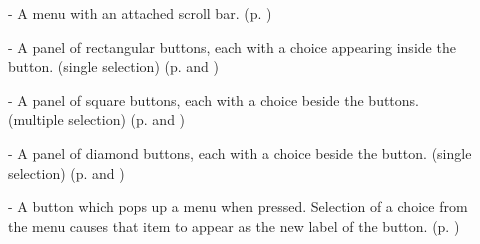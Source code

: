 \begin{itemize}
\begin{description}
\item[]  - A menu with an attached scroll bar.
(p. \pageref{motif-scrolling-menu})

\item[]  - A panel of rectangular buttons, each with a
choice appearing inside the button.  (single selection)
(p. \pageref{motif-buttons} and \pageref{motif-text-buttons})

\item[]  - A panel of square buttons, each with a
choice beside the buttons.  (multiple selection)
(p. \pageref{motif-buttons} and \pageref{motif-check-buttons})

\item[]  - A panel of diamond buttons, each with a
choice beside the button.  (single selection)
(p. \pageref{motif-buttons} and \pageref{motif-radio-buttons})

\item[]  - A button which pops up a menu when pressed.
Selection of a choice from the menu causes that item to appear as the new
label of the button. (p. \pageref{motif-option-button})

\end{description}
\end{itemize}




